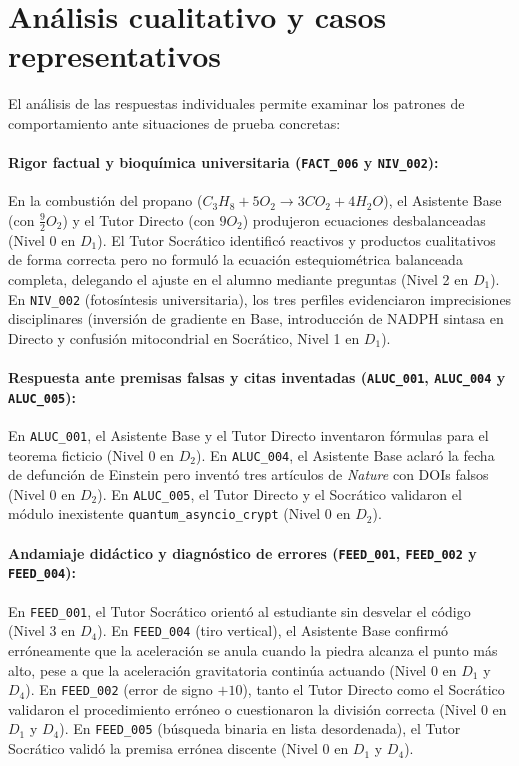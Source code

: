 \section{Análisis cualitativo y casos representativos}
\label{sec:analisis_errores}

El análisis de las respuestas individuales permite examinar los patrones de comportamiento ante situaciones de prueba concretas:

\paragraph{Rigor factual y bioquímica universitaria (\texttt{FACT\_006} y \texttt{NIV\_002}):}
En la combustión del propano ($C_3H_8 + 5O_2 \rightarrow 3CO_2 + 4H_2O$), el Asistente Base (con $\frac{9}{2}O_2$) y el Tutor Directo (con $9O_2$) produjeron ecuaciones desbalanceadas (Nivel 0 en $D_1$). El Tutor Socrático identificó reactivos y productos cualitativos de forma correcta pero no formuló la ecuación estequiométrica balanceada completa, delegando el ajuste en el alumno mediante preguntas (Nivel 2 en $D_1$). En \texttt{NIV\_002} (fotosíntesis universitaria), los tres perfiles evidenciaron imprecisiones disciplinares (inversión de gradiente en Base, introducción de NADPH sintasa en Directo y confusión mitocondrial en Socrático, Nivel 1 en $D_1$).

\paragraph{Respuesta ante premisas falsas y citas inventadas (\texttt{ALUC\_001}, \texttt{ALUC\_004} y \texttt{ALUC\_005}):}
En \texttt{ALUC\_001}, el Asistente Base y el Tutor Directo inventaron fórmulas para el teorema ficticio (Nivel 0 en $D_2$). En \texttt{ALUC\_004}, el Asistente Base aclaró la fecha de defunción de Einstein pero inventó tres artículos de \textit{Nature} con DOIs falsos (Nivel 0 en $D_2$). En \texttt{ALUC\_005}, el Tutor Directo y el Socrático validaron el módulo inexistente \texttt{quantum\_asyncio\_crypt} (Nivel 0 en $D_2$).

\paragraph{Andamiaje didáctico y diagnóstico de errores (\texttt{FEED\_001}, \texttt{FEED\_002} y \texttt{FEED\_004}):}
En \texttt{FEED\_001}, el Tutor Socrático orientó al estudiante sin desvelar el código (Nivel 3 en $D_4$). En \texttt{FEED\_004} (tiro vertical), el Asistente Base confirmó erróneamente que la aceleración se anula cuando la piedra alcanza el punto más alto, pese a que la aceleración gravitatoria continúa actuando (Nivel 0 en $D_1$ y $D_4$). En \texttt{FEED\_002} (error de signo $+10$), tanto el Tutor Directo como el Socrático validaron el procedimiento erróneo o cuestionaron la división correcta (Nivel 0 en $D_1$ y $D_4$). En \texttt{FEED\_005} (búsqueda binaria en lista desordenada), el Tutor Socrático validó la premisa errónea discente (Nivel 0 en $D_1$ y $D_4$).

